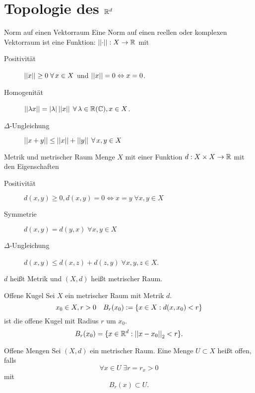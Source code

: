 \documentclass[main.tex]{subfiles}
\begin{document}
\section*{Topologie des \( \mathbb{R}^d \)}

\begin{karte}{Norm auf einen Vektorraum}
    Eine Norm auf einen reellen oder komplexen Vektorraum
    ist eine Funktion: \( \left|\left|\cdot\right|\right| : X \rightarrow \mathbb{R} \) mit
    \begin{description}
        \item[Positivität] \( \norm{x} \geq 0 \; \forall x\in X \) 
        und \( \left|\left|x\right|\right| = 0 \Leftrightarrow x = 0 \).
        \item[Homogenität] \( \norm{\lambda x} = \abs{\lambda} \norm{x}
        \; \forall \lambda \in \R (\C), x\in X \).
        \item[\( \Delta \)-Ungleichung] \( \norm{x+y}
        \leq \norm{x} + \norm{y} \; \forall x,y \in X \)
    \end{description}
\end{karte}

\begin{karte}{Metrik und metrischer Raum}
    Menge \(X\) mit einer Funktion \( d : X\times X \rightarrow \mathbb{R} \)
    mit den Eigenschaften
    \begin{description}
        \item[Positivität] \( d(x,y) \geq 0, d(x,y) = 0 \Leftrightarrow x=y
        \; \forall x,y \in X \)       
        \item[Symmetrie] \( d(x,y) = d(y,x) \; \forall x,y \in X \)
        \item[\( \Delta \)-Ungleichung] 
        \( d(x,y) \leq d(x,z) + d(z, y) 
        \; \forall x,y,z \in X \).
    \end{description}
    \(d\) heißt Metrik und \( (X, d) \) heißt metrischer 
    Raum.
\end{karte}

\begin{karte}{Offene Kugel}
    Sei \(X\) ein metrischer Raum mit Metrik \(d\).
    \[ x_0 \in X, r > 0 \quad B_r(x_0) 
    := \{ x\in X: d(x, x_0) < r \} \] 
    ist die offene Kugel mit Radius \(r\) um \(x_0\).
    \[ B_r(x_0) = \{x \in \mathbb{R}^d: 
    \left|\left|x - x_0\right|\right|_2 < r\}. \]
\end{karte}

\begin{karte}{Offene Mengen}
    Sei \( (X,d) \) ein metrischer Raum. Eine Menge 
    \( U \subset X \) heißt offen, falls 
    \[ \forall x\in U \; \exists r = r_x > 0 \]
    mit 
    \[ B_r(x) \subset U. \]
\end{karte}
\end{document}
